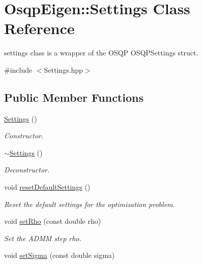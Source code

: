 \section{Osqp\+Eigen\+:\+:Settings Class Reference}
\label{classOsqpEigen_1_1Settings}


settings class is a wrapper of the O\+S\+QP O\+S\+Q\+P\+Settings struct.  




{\ttfamily \#include $<$Settings.\+hpp$>$}

\subsection*{Public Member Functions}
\begin{DoxyCompactItemize}
\item 
\mbox{\label{classOsqpEigen_1_1Settings_a0f16a3c4db592ce554ceacf2d5bff49d}} 
\mbox{\hyperlink{classOsqpEigen_1_1Settings_a0f16a3c4db592ce554ceacf2d5bff49d}{Settings}} ()
\begin{DoxyCompactList}\small\item\em Constructor. \end{DoxyCompactList}\item 
\mbox{\label{classOsqpEigen_1_1Settings_aa4dd86dacba75b83123d1933e944e0e8}} 
\mbox{\hyperlink{classOsqpEigen_1_1Settings_aa4dd86dacba75b83123d1933e944e0e8}{$\sim$\+Settings}} ()
\begin{DoxyCompactList}\small\item\em Deconstructor. \end{DoxyCompactList}\item 
\mbox{\label{classOsqpEigen_1_1Settings_a31f9fb782dc1bcdbe79981bc6464c8af}} 
void \mbox{\hyperlink{classOsqpEigen_1_1Settings_a31f9fb782dc1bcdbe79981bc6464c8af}{reset\+Default\+Settings}} ()
\begin{DoxyCompactList}\small\item\em Reset the default settings for the optimization problem. \end{DoxyCompactList}\item 
void \mbox{\hyperlink{classOsqpEigen_1_1Settings_a7412ba8eb706c52d80673628c54d2a40}{set\+Rho}} (const double rho)
\begin{DoxyCompactList}\small\item\em Set the A\+D\+MM step rho. \end{DoxyCompactList}\item 
void \mbox{\hyperlink{classOsqpEigen_1_1Settings_a59dc6a98b52eece19846a77a00036b5a}{set\+Sigma}} (const double sigma)

\end{DoxyCompactItemize}

